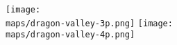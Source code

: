 \begin{multicols*}{2}
\begin{center}
  \vspace*{\fill}
  \texttt{[image: \\maps/dragon-valley-3p.png]}
  \vspace*{\fill}
  \hspace*{-2.5em}\texttt{[image: \\maps/dragon-valley-4p.png]}
\end{center}

\end{multicols*}

